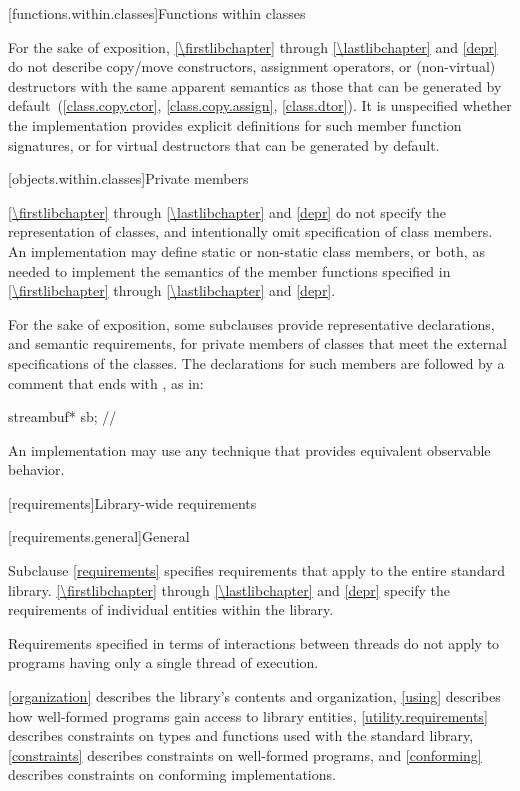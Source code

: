 [functions.within.classes]{Functions within classes}

\pnum
For the sake of exposition, \ref{\firstlibchapter} through \ref{\lastlibchapter}
and \ref{depr} do not describe copy/move constructors, assignment
operators, or (non-virtual) destructors with the same apparent
semantics as those that can be generated
by default~(\ref{class.copy.ctor}, \ref{class.copy.assign}, \ref{class.dtor}).
%
%
%
It is unspecified whether
the implementation provides explicit definitions for such member function
signatures, or for virtual destructors that can be generated by default.

[objects.within.classes]{Private members}

\pnum
\ref{\firstlibchapter} through \ref{\lastlibchapter} and
\ref{depr} do not specify the representation of classes, and intentionally
omit specification of class members. An implementation may
define static or non-static class members, or both, as needed to implement the
semantics of the member functions specified in \ref{\firstlibchapter}
through \ref{\lastlibchapter} and \ref{depr}.

\pnum
For the sake of exposition,
some subclauses provide representative declarations, and semantic requirements, for
private members of classes that meet the external specifications of the classes.
The declarations for such members are
followed by a comment that ends with \expos, as in:

\begin{codeblock}
streambuf* sb;      // \expos
\end{codeblock}

\pnum
An implementation may use any technique that provides equivalent observable behavior.

[requirements]{Library-wide requirements}

[requirements.general]{General}

\pnum
Subclause \ref{requirements} specifies requirements that apply to the entire \Cpp{} standard library.
\ref{\firstlibchapter} through \ref{\lastlibchapter} and \ref{depr}
specify the requirements of individual entities within the library.

\pnum
Requirements specified in terms of interactions between threads do not apply to
programs having only a single thread of execution.

\pnum
\ref{organization} describes the library's contents and
organization, \ref{using} describes how well-formed \Cpp{} programs gain access to library
entities,
\ref{utility.requirements} describes constraints on types and functions used with
the \Cpp{} standard library,
\ref{constraints} describes constraints on well-formed \Cpp{} programs, and
\ref{conforming} describes constraints on conforming implementations.

